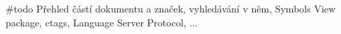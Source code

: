 \#todo Přehled částí dokumentu a značek, vyhledávání v něm, Symbols View package, ctags, Language Server Protocol, ...
